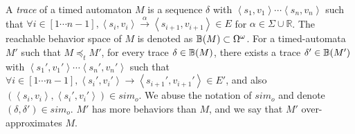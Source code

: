 A \emph{trace} of a timed automaton $M$ is a sequence $\delta$ with $\left\langle s_1,v_1\right\rangle\cdots\left\langle s_n,v_n\right\rangle$ such that $\forall i\in[1\cdots n-1], \left\langle s_i,v_i\right\rangle\xrightarrow{\alpha}\left\langle s_{i+1},v_{i+1}\right\rangle\in E$ for $\alpha\in\Sigma\cup\mathbb{R}$. The reachable behavior space of $M$ is denoted as $\mathbb{B}(M)\subset \Omega^\omega$. 
For a timed-automata $M'$ such that $M\preceq_t M'$, for every trace $\delta\in\mathbb{B}{(M)}$, there exists a trace $\delta'\in\mathbb{B}{(M')}$ with $\left\langle s_1',v_1'\right\rangle\cdots\left\langle s_n',v_n'\right\rangle$ such that $\forall i\in[1\cdots n-1], \left\langle s_i',v_i'\right\rangle\rightarrow\left\langle s_{i+1}',v_{i+1}'\right\rangle\in E'$, and also $(\left\langle s_i,v_i\right\rangle,\left\langle s_i',v_i'\right\rangle)\in sim_o$. We abuse the notation of  $sim_o$ and denote $(\delta,\delta')\in sim_o$. $M'$ has more behaviors than $M$, and we say that $M'$ over-approximates $M$. %


